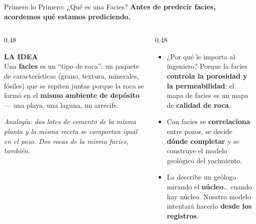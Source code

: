 \documentclass[aspectratio=169, 11pt]{beamer}
\begin{document}
\begin{frame}[shrink=8]{Primero lo Primero: ¿Qué es una Facies?}
  \vspace{-4pt}
  {\small\color{arcaDark}\bfseries
    Antes de predecir facies, acordemos qué estamos prediciendo.}

  \vspace{8pt}
  \begin{columns}[T]
    \begin{column}{0.48\textwidth}
      \begin{tcolorbox}[colback=arcaGray, colframe=arcaRed, boxrule=0pt, leftrule=3pt,
        arc=3pt, left=6pt, right=6pt, top=5pt, bottom=5pt]
        {\scriptsize\color{arcaRed}\bfseries\faLayerGroup\hspace{4pt}LA IDEA}\\[4pt]
        {\scriptsize\color{textMuted}
          Una \textbf{facies} es un ``tipo de roca'': un paquete de
          características (grano, textura, minerales, fósiles) que
          se repiten juntas porque la roca se formó en el
          \textbf{mismo ambiente de depósito} --- una playa,
          una laguna, un arrecife.}
      \end{tcolorbox}
      \vspace{6pt}
      {\scriptsize\color{textMuted}\itshape
        Analogía: dos lotes de cemento de la misma planta y la misma
        receta se comportan igual en el pozo. Dos rocas de la misma
        facies, también.}
    \end{column}
    \begin{column}{0.48\textwidth}
      {\footnotesize\color{textMuted}
      \begin{itemize}\setlength{\itemsep}{5pt}
        \item[{\color{arcaRed}\scriptsize\faArrowRight}]
          ¿Por qué le importa al ingeniero? Porque la facies
          \textbf{controla la porosidad y la permeabilidad}:
          el mapa de facies es un mapa de \textbf{calidad de roca}.
        \item[{\color{arcaRed}\scriptsize\faArrowRight}]
          Con facies se \textbf{correlaciona} entre pozos, se decide
          \textbf{dónde completar} y se construye el modelo geológico
          del yacimiento.
        \item[{\color{codeGreen}\scriptsize\faCheck}]
          La describe un geólogo mirando el \textbf{núcleo}\ldots{}
          cuando hay núcleo. Nuestro modelo intentará hacerlo
          \textbf{desde los registros}.
      \end{itemize}
      }
    \end{column}
  \end{columns}
\end{frame}
\end{document}
